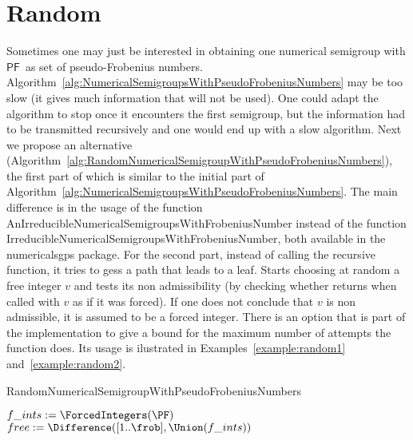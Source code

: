 \documentclass[11pt]{amsart}
\theoremstyle{remark}
\begin{document}
\section{Random}
\label{sec:random}
Sometimes one may just be interested in obtaining one numerical semigroup with {\ensuremath{\mathsf{PF}}}\ as set of pseudo-Frobenius numbers.
Algorithm~\ref{alg:NumericalSemigroupsWithPseudoFrobeniusNumbers} may be too slow (it gives much information that will not be used).
One could adapt the algorithm to stop once it encounters the first semigroup, but the information had to be transmitted recursively and one would end up with a slow algorithm.
Next we propose an alternative (Algorithm~\ref{alg:RandomNumericalSemigroupWithPseudoFrobeniusNumbers}), the first part of which is similar to the initial part of Algorithm~\ref{alg:NumericalSemigroupsWithPseudoFrobeniusNumbers}. The main difference is in the usage of the function \textrm{AnIrreducibleNumericalSemigroupsWithFrobeniusNumber} instead of the function \textrm{IrreducibleNumericalSemigroupsWithFrobeniusNumber}, both available in the \textsf{numericalsgps} package.
For the second part, instead of calling the recursive function, it tries to gess a path that leads to a leaf. Starts choosing at random a free integer $v$ and tests its non admissibility (by checking whether \SimpleForcedIntegers returns \fail when called with $v$ as if it was forced). If one does not conclude that $v$ is non admissible, it is assumed to be a forced integer.
There is an option that is part of the implementation to give a bound for the maximum number of attempts the function does. Its usage is ilustrated in Examples~\ref{example:random1} and~\ref{example:random2}.
\begin{algorithm}[ht]\caption{RandomNumericalSemigroupWithPseudoFrobeniusNumbers\label{alg:RandomNumericalSemigroupWithPseudoFrobeniusNumbers}}
\If{$\Not\ \PF[\type] - \PF[\type-1] > \PF[1])$}{\Return \fail;}
$f\_ints := \ForcedIntegers(\PF)$\;
$free := \Difference([1..\frob],\Union(f\_ints))$\;
\end{algorithm}
\end{document}
